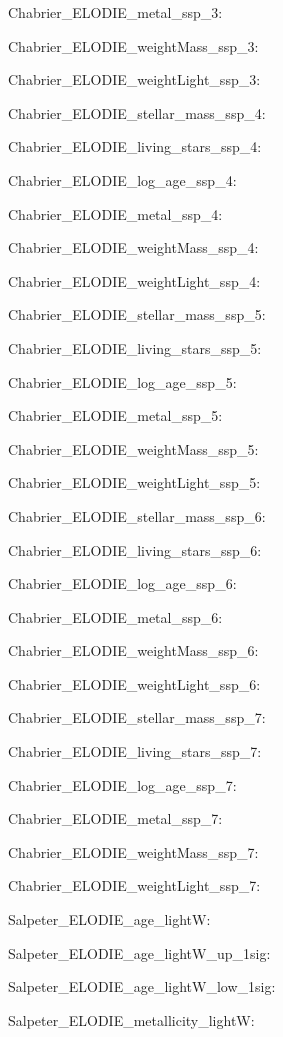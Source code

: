 \item Chabrier\_ELODIE\_metal\_ssp\_3: 
\item Chabrier\_ELODIE\_weightMass\_ssp\_3: 
\item Chabrier\_ELODIE\_weightLight\_ssp\_3: 
\item Chabrier\_ELODIE\_stellar\_mass\_ssp\_4: 
\item Chabrier\_ELODIE\_living\_stars\_ssp\_4: 
\item Chabrier\_ELODIE\_log\_age\_ssp\_4: 
\item Chabrier\_ELODIE\_metal\_ssp\_4: 
\item Chabrier\_ELODIE\_weightMass\_ssp\_4: 
\item Chabrier\_ELODIE\_weightLight\_ssp\_4: 
\item Chabrier\_ELODIE\_stellar\_mass\_ssp\_5: 
\item Chabrier\_ELODIE\_living\_stars\_ssp\_5: 
\item Chabrier\_ELODIE\_log\_age\_ssp\_5: 
\item Chabrier\_ELODIE\_metal\_ssp\_5: 
\item Chabrier\_ELODIE\_weightMass\_ssp\_5: 
\item Chabrier\_ELODIE\_weightLight\_ssp\_5: 
\item Chabrier\_ELODIE\_stellar\_mass\_ssp\_6: 
\item Chabrier\_ELODIE\_living\_stars\_ssp\_6: 
\item Chabrier\_ELODIE\_log\_age\_ssp\_6: 
\item Chabrier\_ELODIE\_metal\_ssp\_6: 
\item Chabrier\_ELODIE\_weightMass\_ssp\_6: 
\item Chabrier\_ELODIE\_weightLight\_ssp\_6: 
\item Chabrier\_ELODIE\_stellar\_mass\_ssp\_7: 
\item Chabrier\_ELODIE\_living\_stars\_ssp\_7: 
\item Chabrier\_ELODIE\_log\_age\_ssp\_7: 
\item Chabrier\_ELODIE\_metal\_ssp\_7: 
\item Chabrier\_ELODIE\_weightMass\_ssp\_7: 
\item Chabrier\_ELODIE\_weightLight\_ssp\_7: 
\item Salpeter\_ELODIE\_age\_lightW: 
\item Salpeter\_ELODIE\_age\_lightW\_up\_1sig: 
\item Salpeter\_ELODIE\_age\_lightW\_low\_1sig: 
\item Salpeter\_ELODIE\_metallicity\_lightW: 
